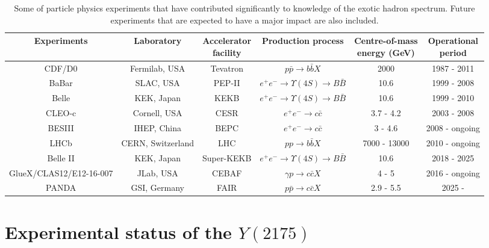 \begin{landscape}
    \vspace*{\fill}   
\begin{table}[H]
    \centering
    \small
    \setlength{\tabcolsep}{3pt}
    \caption{Some of particle physics experiments that have contributed significantly to knowledge of the exotic hadron spectrum. Future experiments that are expected to have a major impact are also included.}
    \label{tab.1.3}
    \begin{tabular}{cccccc}
        \hline
        Experiments & Laboratory & \thead{Accelerator \\ facility} & Production process & \thead{Centre-of-mass\\energy (GeV)} & \thead{Operational \\ period} \\
        \hline
        CDF/D0 & Fermilab, USA & Tevatron & $p\bar{p} \rightarrow b\bar{b}X$ & 2000 & 1987 - 2011 \\
        BaBar & SLAC, USA & PEP-II & $e^{+}e^{-} \rightarrow \Upsilon(4S) \rightarrow B\bar{B}$ & 10.6 & 1999 - 2008 \\
        Belle & KEK, Japan & KEKB & $e^{+}e^{-} \rightarrow \Upsilon(4S) \rightarrow B\bar{B}$ & 10.6 & 1999 - 2010 \\
        CLEO-c & Cornell, USA & CESR & $e^{+}e^{-} \rightarrow c\bar{c}$ & 3.7 - 4.2 & 2003 - 2008 \\
        BESIII & IHEP, China & BEPC & $e^{+}e^{-} \rightarrow  c\bar{c}$ & 3 - 4.6 & 2008 - ongoing \\
        LHCb & CERN, Switzerland & LHC & $pp \rightarrow b\bar{b}X$ & 7000 - 13000 & 2010 - ongoing \\
        Belle II & KEK, Japan & Super-KEKB & $e^{+}e^{-} \rightarrow \Upsilon(4S) \rightarrow B\bar{B}$ & 10.6 & 2018 - 2025 \\
        GlueX/CLAS12/E12-16-007 & JLab, USA & CEBAF & $\gamma p \rightarrow c\bar{c} X$ & 4 - 5 & 2016 - ongoing \\
        PANDA & GSI, Germany & FAIR & $p\bar{p} \rightarrow c\bar{c} X$ & 2.9 - 5.5 & 2025 -  \\
        \hline
    \end{tabular}
\end{table}
\vspace*{\fill}
\end{landscape}

\section{Experimental status of the $Y(2175)$}
\label{p.1.4}

